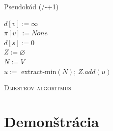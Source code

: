 \documentclass{beamer}
\newcounter{sectionslides}
\newcommand{\sectionslidenumber}{
  (\thesectionslides/\the\numexpr\insertsectionendpage-\insertsectionstartpage+1\relax)
}
\begin{document}
\begin{frame}{Pseudokód\sectionslidenumber}
	\footnotesize
	\IncMargin{1.5em}
	\begin{algorithm}[H]
		{
			$d[v] := \infty$\\
			$\pi[v] := None$\\ 
		}
		$d[s] := 0$\\
		$Z := \varnothing$\\
		$N := V$\\
		{
			$u := $ extract-min$(N)$; $Z.add(u)$\\
		}
	
		\caption{\textsc{Dijkstrov algoritmus}}
		\label{algorithm:dijkstra}
	\end{algorithm}
	\DecMargin{1.5em}
	\normalsize
\end{frame}


\section{Demonštrácia}
\end{document}
